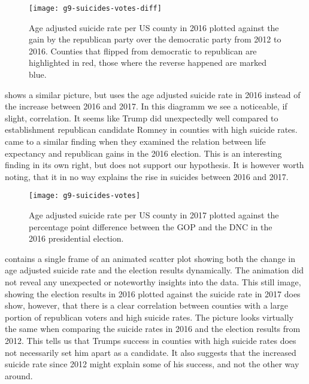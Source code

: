 \begin{figure}[tb]
\centering
\texttt{[image: g9-suicides-votes-diff]}
\caption{Age adjusted suicide rate per US county in 2016 plotted against the gain by the republican party over the democratic party from 2012 to 2016. Counties that flipped from democratic to republican are highlighted in red, those where the reverse happened are marked blue.}
\label{fig:suicides-votes-diff}
\end{figure}

\par
{} shows a similar picture, but uses the age adjusted suicide rate in 2016 instead of the increase between 2016 and 2017.
In this diagramm we see a noticeable, if slight, correlation.
It seems like Trump did unexpectedly well compared to establishment republican candidate Romney in counties with high suicide rates.
\cite{goldman2018} came to a similar finding when they examined the relation between life expectancy and republican gains in the 2016 election.
This is an interesting finding in its own right, but does not support our hypothesis.
It is however worth noting, that it in no way explains the rise in suicides between 2016 and 2017.

\begin{figure}[tb]
\centering
\texttt{[image: g9-suicides-votes]}
\caption{Age adjusted suicide rate per US county in 2017 plotted against the percentage point difference between the GOP and the DNC in the 2016 presidential election.}
\label{fig:suicides-votes}
\end{figure}

\par
{} contains a single frame of an animated scatter plot showing both the change in age adjusted suicide rate and the election results dynamically.
The animation did not reveal any unexpected or noteworthy insights into the data.
This still image, showing the election results in 2016 plotted against the suicide rate in 2017 does show, however, that there is a clear correlation between counties with a large portion of republican voters and high suicide rates.
The picture looks virtually the same when comparing the suicide rates in 2016 and the election results from 2012.
This tells us that Trumps success in counties with high suicide rates does not necessarily set him apart as a candidate.
It also suggests that the increased suicide rate since 2012 might explain some of his success, and not the other way around.

